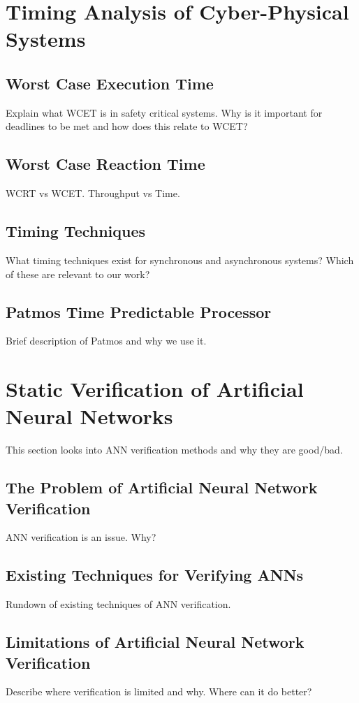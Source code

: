 \section{Timing Analysis of Cyber-Physical Systems}
\subsection{Worst Case Execution Time}
Explain what WCET is in safety critical systems. Why is it important for deadlines to be met and how does this relate to WCET?

\subsection{Worst Case Reaction Time}
WCRT vs WCET. Throughput vs Time.

\subsection{Timing Techniques}
What timing techniques exist for synchronous and asynchronous systems? Which of these are relevant to our work?

\subsection{Patmos Time Predictable Processor}
Brief description of Patmos and why we use it.


\section{Static Verification of Artificial Neural Networks}
This section looks into ANN verification methods and why they are good/bad.

\subsection{The Problem of Artificial Neural Network Verification}
ANN verification is an issue. Why?

\subsection{Existing Techniques for Verifying ANNs}
Rundown of existing techniques of ANN verification.

\subsection{Limitations of Artificial Neural Network Verification}
Describe where verification is limited and why.
Where can it do better?


